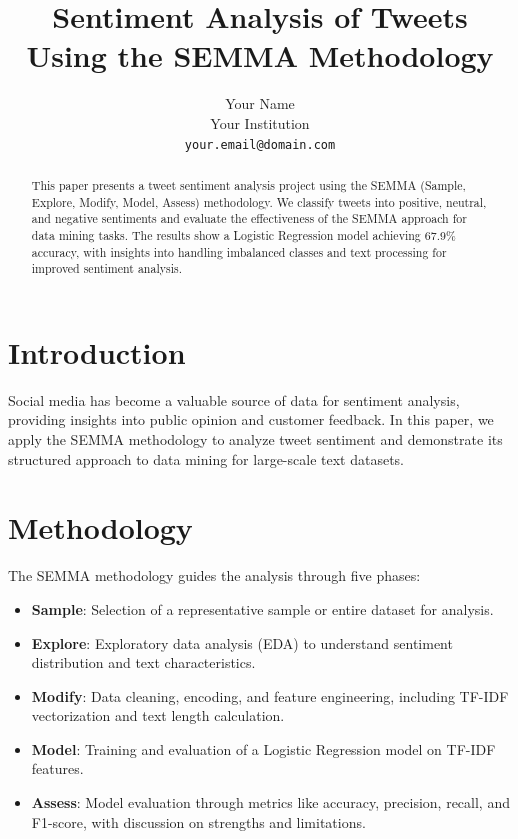 \documentclass{article}
\title{Sentiment Analysis of Tweets Using the SEMMA Methodology}
\author{Your Name \\
        Your Institution \\
        \texttt{your.email@domain.com}}
\date{}
\begin{document}
\maketitle

\begin{abstract}
This paper presents a tweet sentiment analysis project using the SEMMA (Sample, Explore, Modify, Model, Assess) methodology. We classify tweets into positive, neutral, and negative sentiments and evaluate the effectiveness of the SEMMA approach for data mining tasks. The results show a Logistic Regression model achieving 67.9\% accuracy, with insights into handling imbalanced classes and text processing for improved sentiment analysis.
\end{abstract}

\section{Introduction}
Social media has become a valuable source of data for sentiment analysis, providing insights into public opinion and customer feedback. In this paper, we apply the SEMMA methodology to analyze tweet sentiment and demonstrate its structured approach to data mining for large-scale text datasets.

\section{Methodology}
The SEMMA methodology guides the analysis through five phases:
\begin{itemize}
    \item \textbf{Sample}: Selection of a representative sample or entire dataset for analysis.
    \item \textbf{Explore}: Exploratory data analysis (EDA) to understand sentiment distribution and text characteristics.
    \item \textbf{Modify}: Data cleaning, encoding, and feature engineering, including TF-IDF vectorization and text length calculation.
    \item \textbf{Model}: Training and evaluation of a Logistic Regression model on TF-IDF features.
    \item \textbf{Assess}: Model evaluation through metrics like accuracy, precision, recall, and F1-score, with discussion on strengths and limitations.
\end{itemize}
\end{document}
